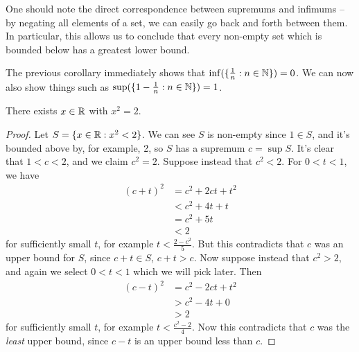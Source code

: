 \documentclass{../../template/note}
\begin{document}
    \begin{remark*}
        One should note the direct correspondence between supremums and infimums -- by negating all elements of a set, we can easily go back and forth between them. In particular, this allows us to conclude that every non-empty set which is bounded below has a greatest lower bound.
    \end{remark*}
    
    \begin{corollary}[Corollary\(^2\)]
        The previous corollary immediately shows that \(\inf(\{\frac{1}{n}: n \in \mathbb N\}) = 0\). We can now also show things such as \(\sup(\{1 - \frac{1}{n}: n \in \mathbb N\}) = 1\).
    \end{corollary}
    
    \begin{theorem}
        There exists \(x \in \mathbb R\) with \(x^2 = 2\).
    \end{theorem}
    
    \begin{proof}
        Let \(S = \{x \in \mathbb R: x^2 < 2\}\). We can see \(S\) is non-empty since \(1 \in S\), and it's bounded above by, for example, 2, so \(S\) has a supremum \(c = \sup S\). It's clear that \(1 < c < 2\), and we claim \(c^2 = 2\). Suppose instead that \(c^2 < 2\). For \(0 < t < 1\), we have
        \begin{align*}
            (c+t)^2 &= c^2 + 2ct + t^2 \\
            &< c^2 + 4t + t \\
            &= c^2 + 5t \\
            &< 2
        \end{align*}
        for sufficiently small \(t\), for example \(t < \frac{2-c^2}{5}\). But this contradicts that \(c\) was an upper bound for \(S\), since \(c + t \in S\), \(c + t > c\). Now suppose instead that \(c^2 > 2\), and again we select \(0 < t < 1\) which we will pick later. Then
        \begin{align*}
            (c-t)^2 &= c^2 - 2ct + t^2 \\
            &> c^2 - 4t + 0 \\
            &> 2
        \end{align*}
        for sufficiently small \(t\), for example \(t < \frac{c^2-2}{4}\). Now this contradicts that \(c\) was the \emph{least} upper bound, since \(c-t\) is an upper bound less than \(c\).
    \end{proof}
    
\end{document}
